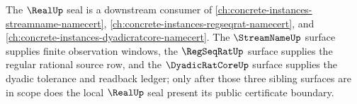 The $\RealUp$ seal is a downstream consumer of \autoref{ch:concrete-instances-streamname-namecert}, \autoref{ch:concrete-instances-regseqrat-namecert}, and \autoref{ch:concrete-instances-dyadicratcore-namecert}. The $\StreamNameUp$ surface supplies finite observation windows, the $\RegSeqRatUp$ surface supplies the regular rational source row, and the $\DyadicRatCoreUp$ surface supplies the dyadic tolerance and readback ledger; only after those three sibling surfaces are in scope does the local $\RealUp$ seal present its public certificate boundary.

